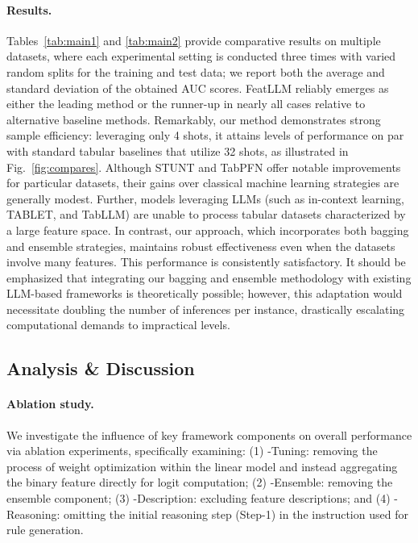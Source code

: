 \vspace*{-0.12in}
\paragraph{Results.}
Tables~\ref{tab:main1} and \ref{tab:main2} provide comparative results on multiple datasets, where each experimental setting is conducted three times with varied random splits for the training and test data; we report both the average and standard deviation of the obtained AUC scores. \textsf{FeatLLM} reliably emerges as either the leading method or the runner-up in nearly all cases relative to alternative baseline methods. Remarkably, our method demonstrates strong sample efficiency: leveraging only 4 shots, it attains levels of performance on par with standard tabular baselines that utilize 32 shots, as illustrated in Fig.~\ref{fig:compares}. Although STUNT and TabPFN offer notable improvements for particular datasets, their gains over classical machine learning strategies are generally modest. Further, models leveraging LLMs (such as in-context learning, TABLET, and TabLLM) are unable to process tabular datasets characterized by a large feature space. In contrast, our approach, which incorporates both bagging and ensemble strategies, maintains robust effectiveness even when the datasets involve many features. This performance is consistently satisfactory. It should be emphasized that integrating our bagging and ensemble methodology with existing LLM-based frameworks is theoretically possible; however, this adaptation would necessitate doubling the number of inferences per instance, drastically escalating computational demands to impractical levels.

\subsection{Analysis \& Discussion}
\label{sec:analysis}
\paragraph{Ablation study.} We investigate the influence of key framework components on overall performance via ablation experiments, specifically examining: (1) \textsf{-Tuning}: removing the process of weight optimization within the linear model and instead aggregating the binary feature directly for logit computation; (2) \textsf{-Ensemble}: removing the ensemble component; (3) \textsf{-Description}: excluding feature descriptions; and (4) \textsf{-Reasoning}: omitting the initial reasoning step (Step-1) in the instruction used for rule generation.

